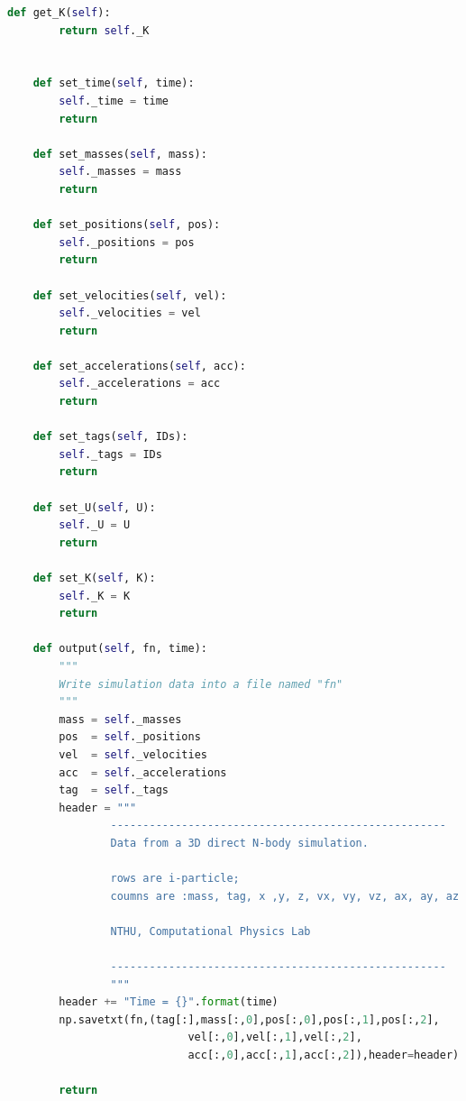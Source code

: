 \documentclass[12pt]{article}
\begin{document}
\begin{lstlisting}[language={Python}]
    def get_K(self):
        return self._K


    def set_time(self, time):
        self._time = time
        return
    
    def set_masses(self, mass):
        self._masses = mass
        return
    
    def set_positions(self, pos):
        self._positions = pos
        return
    
    def set_velocities(self, vel):
        self._velocities = vel
        return
    
    def set_accelerations(self, acc):
        self._accelerations = acc
        return
    
    def set_tags(self, IDs):
        self._tags = IDs
        return
    
    def set_U(self, U):
        self._U = U
        return
    
    def set_K(self, K):
        self._K = K
        return
    
    def output(self, fn, time):
        """
        Write simulation data into a file named "fn"
        """
        mass = self._masses
        pos  = self._positions
        vel  = self._velocities
        acc  = self._accelerations
        tag  = self._tags
        header = """
                ----------------------------------------------------
                Data from a 3D direct N-body simulation. 

                rows are i-particle; 
                coumns are :mass, tag, x ,y, z, vx, vy, vz, ax, ay, az

                NTHU, Computational Physics Lab

                ----------------------------------------------------
                """
        header += "Time = {}".format(time)
        np.savetxt(fn,(tag[:],mass[:,0],pos[:,0],pos[:,1],pos[:,2],
                            vel[:,0],vel[:,1],vel[:,2],
                            acc[:,0],acc[:,1],acc[:,2]),header=header)

        return
    \end{lstlisting}
\end{document}
